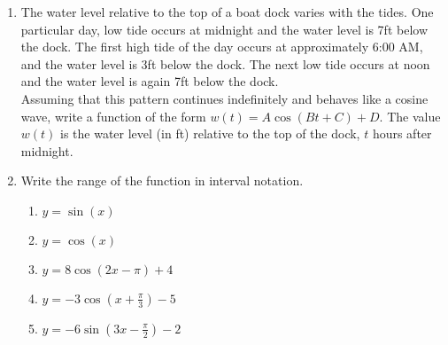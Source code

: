 \documentclass[11pt]{article}
\begin{document}
\begin{enumerate}
\begin{center}
\end{center}


\vfill



\newpage
\item The water level relative to the top of a boat dock varies with the tides.  One particular day, low tide occurs at midnight and the water level is 7ft below the dock.  The first high tide of the day occurs at approximately 6:00 AM, and the water level is 3ft below the dock.  The next low tide occurs at noon and the water level is again 7ft below the dock.\\
Assuming that this pattern continues indefinitely and behaves like a cosine wave, write a function of the form $w(t)=A\cos(Bt+C)+D$.  The value $w(t)$ is the water level (in ft) relative to the top of the dock, $t$ hours after midnight.

\newpage

\item Write the range of the function in interval notation.
\begin{enumerate}
\item $y=\sin(x)$\\[0.2in]
\item $y=\cos(x)$\\[0.2in]
\item $y=8\cos(2x-\pi)+4$\vfill
\item $y=-3\cos(x+\frac{\pi}{3})-5$\vfill
\item $y=-6\sin(3x-\frac{\pi}{2})-2$\vfill
\end{enumerate}
\end{enumerate}
\end{document}
